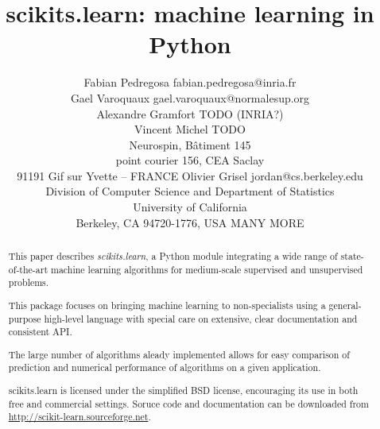 \documentclass[twoside,11pt]{article}
\begin{document}
\title{scikits.learn: machine learning in Python}


\author{\name Fabian Pedregosa \email fabian.pedregosa@inria.fr \\
        \name Gael Varoquaux \email gael.varoquaux@normalesup.org  \\
        \name Alexandre Gramfort \email TODO (INRIA?)\\
        \name Vincent Michel  \email TODO \\
       \addr  Neurospin, B\^atiment 145\\
       point courier 156, CEA Saclay\\
       91191 Gif sur Yvette – FRANCE
       \AND
       \name Olivier Grisel \email jordan@cs.berkeley.edu \\
       \addr Division of Computer Science and Department of Statistics\\
       University of California\\
       Berkeley, CA 94720-1776, USA
       \AND
       \name MANY MORE
}



\maketitle

\begin{abstract}
This paper describes \emph{scikits.learn}, a Python module integrating
a wide range of state-of-the-art machine learning algorithms for
medium-scale supervised and unsupervised problems. 

This package focuses on bringing machine learning to non-specialists
using a general-purpose high-level language with special care on
extensive, clear documentation and consistent API.

The large number of algorithms aleady implemented allows for easy
comparison of prediction and numerical performance of algorithms on a
given application.


scikits.learn is licensed under the simplified BSD license,
encouraging its use in both free and commercial settings. Soruce code
and documentation can be downloaded from
\url{http://scikit-learn.sourceforge.net}.

\end{abstract}



\end{document}
